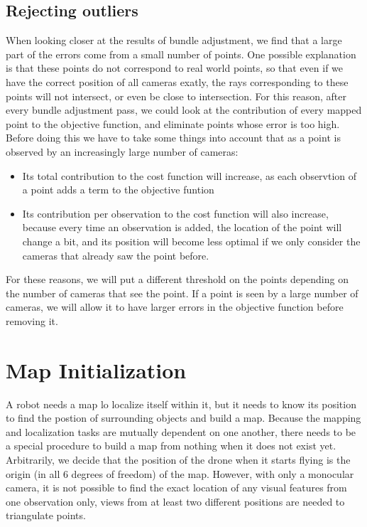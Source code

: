 \subsection{Rejecting outliers}
When looking closer at the results of bundle adjustment, we find that a large part of the errors come from a small number of points. One possible explanation is that these points do not correspond to real world points, so that even if we have the correct position of all cameras exatly, the rays corresponding to these points will not intersect, or even be close to intersection. For this reason, after every bundle adjustment pass, we could look at the contribution of every mapped point to the objective function, and eliminate points whose error is too high. Before doing this we have to take some things into account that as a point is observed by an increasingly large number of cameras:
\begin{itemize}
  \item Its total contribution to the cost function will increase, as each observtion of a point adds a term to the objective funtion
  \item Its contribution per observation to the cost function will also increase, because every time an observation is added, the location of the point will change a bit, and its position will become less optimal if we only consider the cameras that already saw the point before.
\end{itemize}
For these reasons, we will put a different threshold on the points depending on the number of cameras that see the point. If a point is seen by a large number of cameras, we will allow it to have larger errors in the objective function before removing it.











\section{Map Initialization}
A robot needs a map lo localize itself within it, but it needs to know its position to find the postion of surrounding objects and build a map. Because the mapping and localization tasks are mutually dependent on one another, there needs to be a special procedure to build a map from nothing when it does not exist yet. Arbitrarily, we decide that the position of the drone when it starts flying is the origin (in all 6 degrees of freedom) of the map. However, with only a monocular camera, it is not possible to find the exact location of any visual features from one observation only, views from at least two different positions are needed to triangulate points.


